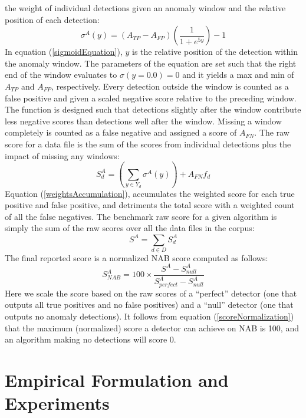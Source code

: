 \documentclass[12pt]{article}
\begin{document}
the weight of individual detections given an anomaly window
and the relative position of each detection:
\begin{equation}
\sigma^{A}(y) = (A_{TP} - A_{FP})(\frac{1}{1+e^{5y}})-1
\label{sigmoidEquation}
\end{equation}
In equation (\ref{sigmoidEquation}), $y$ is the relative position of the detection within the
anomaly window. The parameters of the equation are set such that
the right end of the window evaluates to $\sigma(y = 0.0) = 0$ and it yields a max and min of $A_{TP}$ and $A_{FP}$, respectively. Every detection outside the window is counted as
a false positive and given a scaled negative score relative to the
preceding window. The function is designed such that
detections slightly after the window contribute less negative
scores than detections well after the window. Missing a
window completely is counted as a false negative and assigned
a score of $A_{FN}$. The raw score for a data file is the sum of the scores from
individual detections plus the impact of missing any windows:
\begin{equation}
S^A_d = (\sum_{y \in Y_d} \sigma^A(y)) + A_{FN}f_d
\label{weightsAccumulation}
\end{equation}
Equation (\ref{weightsAccumulation}), accumulates the weighted score for each true positive
and false positive, and detriments the total score with a
weighted count of all the false negatives. The benchmark raw score for a given algorithm is simply the sum of the raw scores
over all the data files in the corpus:
\begin{equation}
S^A = \sum_{d \in D} S^A_d
\label{allScore}
\end{equation}
The final reported score is a normalized NAB score computed as follows:
\begin{equation}
S^A_{NAB} = 100 \times \frac{S^A - S^A_{null}}{S^A_{perfect} - S^A_{null}}
\label{scoreNormalization}
\end{equation}
Here we scale the score based on the raw scores of a “perfect”
detector (one that outputs all true positives and no false
positives) and a “null” detector (one that outputs no anomaly
detections). It follows from equation (\ref{scoreNormalization}) that the maximum (normalized) score a detector can achieve on NAB is 100, and an algorithm making no detections will score 0.
\newpage
\section{Empirical Formulation and Experiments}
\end{document}
